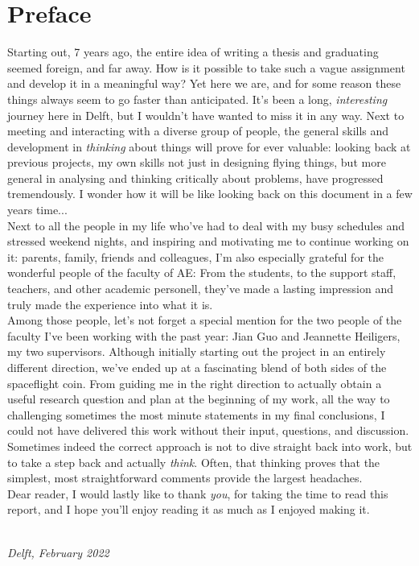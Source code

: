 \chapter*{Preface}

Starting out, 7 years ago, the entire idea of writing a thesis and graduating seemed foreign, and far away. How is it possible to take such a vague assignment and develop it in a meaningful way? Yet here we are, and for some reason these things always seem to go faster than anticipated. It's been a long, \textit{interesting} journey here in Delft, but I wouldn't have wanted to miss it in any way. Next to meeting and interacting with a diverse group of people, the general skills and development in \textit{thinking} about things will prove for ever valuable: looking back at previous projects, my own skills not just in designing flying things, but more general in analysing and thinking critically about problems, have progressed tremendously. I wonder how it will be like looking back on this document in a few years time...\\

Next to all the people in my life who've had to deal with my busy schedules and stressed weekend nights, and inspiring and motivating me to continue working on it: parents, family, friends and colleagues, I'm also especially grateful for the wonderful people of the faculty of AE: From the students, to the support staff, teachers, and other academic personell, they've made a lasting impression and truly made the experience into what it is. \\

Among those people, let's not forget a special mention for the two people of the faculty I've been working with the past year: Jian Guo and Jeannette Heiligers, my two supervisors. Although initially starting out the project in an entirely different direction, we've ended up at a fascinating blend of both sides of the spaceflight coin. From guiding me in the right direction to actually obtain a useful research question and plan at the beginning of my work, all the way to challenging sometimes the most minute statements in my final conclusions, I could not have delivered this work without their input, questions, and discussion. Sometimes indeed the correct approach is not to dive straight back into work, but to take a step back and actually \textit{think}. Often, that thinking proves that the simplest, most straightforward comments provide the largest headaches.\\

Dear reader, I would lastly like to thank \textit{you}, for taking the time to read this report, and I hope you'll enjoy reading it as much as I enjoyed making it.

\begin{flushright}
{\makeatletter\itshape
    \@author \\
    Delft, February 2022
\makeatother}
\end{flushright}

